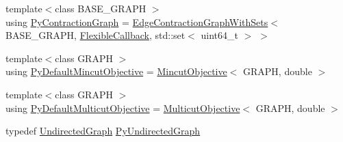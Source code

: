 \begin{DoxyCompactItemize}
\item 
{\footnotesize template$<$class B\+A\+S\+E\+\_\+\+G\+R\+A\+P\+H $>$ }\\using \hyperlink{namespacenifty_1_1graph_aa9ab054f2ea0df09d60d6adf1c7ee6b3}{Py\+Contraction\+Graph} = \hyperlink{classnifty_1_1graph_1_1EdgeContractionGraphWithSets}{Edge\+Contraction\+Graph\+With\+Sets}$<$ B\+A\+S\+E\+\_\+\+G\+R\+A\+P\+H, \hyperlink{structnifty_1_1graph_1_1FlexibleCallback}{Flexible\+Callback}, std\+::set$<$ uint64\+\_\+t $>$ $>$
\item 
{\footnotesize template$<$class G\+R\+A\+P\+H $>$ }\\using \hyperlink{namespacenifty_1_1graph_ab129a9876a746581d5ce26f3af9f676e}{Py\+Default\+Mincut\+Objective} = \hyperlink{classnifty_1_1graph_1_1MincutObjective}{Mincut\+Objective}$<$ G\+R\+A\+P\+H, double $>$
\item 
{\footnotesize template$<$class G\+R\+A\+P\+H $>$ }\\using \hyperlink{namespacenifty_1_1graph_af3761eb48c25055911bbb9d073dccbf4}{Py\+Default\+Multicut\+Objective} = \hyperlink{classnifty_1_1graph_1_1MulticutObjective}{Multicut\+Objective}$<$ G\+R\+A\+P\+H, double $>$
\item 
typedef \hyperlink{classnifty_1_1graph_1_1UndirectedGraph}{Undirected\+Graph} \hyperlink{namespacenifty_1_1graph_a62ff5304d118f627910196adc6ab7aab}{Py\+Undirected\+Graph}
\end{DoxyCompactItemize}
